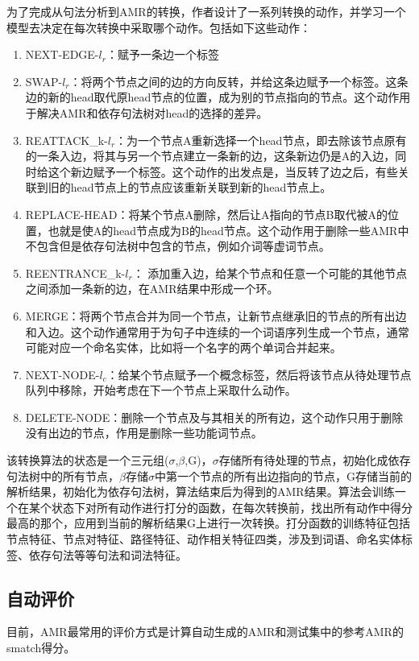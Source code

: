 \documentclass[master, winfont]{njuthesis}
\begin{document}
为了完成从句法分析到AMR的转换，作者设计了一系列转换的动作，并学习一个模型去决定在每次转换中采取哪个动作。包括如下这些动作：
\begin{enumerate}
	\item NEXT-EDGE-$l_r$：赋予一条边一个标签
	\item SWAP-$l_r$：将两个节点之间的边的方向反转，并给这条边赋予一个标签。这条边的新的head取代原head节点的位置，成为别的节点指向的节点。这个动作用于解决AMR和依存句法树对head的选择的差异。
	\item REATTACK\_k-$l_r$：为一个节点A重新选择一个head节点，即去除该节点原有的一条入边，将其与另一个节点建立一条新的边，这条新边仍是A的入边，同时给这个新边赋予一个标签。这个动作的出发点是，当反转了边之后，有些关联到旧的head节点上的节点应该重新关联到新的head节点上。
	\item REPLACE-HEAD：将某个节点A删除，然后让A指向的节点B取代被A的位置，也就是使A的head节点成为B的head节点。这个动作用于删除一些AMR中不包含但是依存句法树中包含的节点，例如介词等虚词节点。
	\item REENTRANCE\_k-$l_r$：	添加重入边，给某个节点和任意一个可能的其他节点之间添加一条新的边，在AMR结果中形成一个环。
	\item MERGE：将两个节点合并为同一个节点，让新节点继承旧的节点的所有出边和入边。这个动作通常用于为句子中连续的一个词语序列生成一个节点，通常可能对应一个命名实体，比如将一个名字的两个单词合并起来。
	\item NEXT-NODE-$l_c$：给某个节点赋予一个概念标签，然后将该节点从待处理节点队列中移除，开始考虑在下一个节点上采取什么动作。
	\item DELETE-NODE：删除一个节点及与其相关的所有边，这个动作只用于删除没有出边的节点，作用是删除一些功能词节点。
\end{enumerate}

该转换算法的状态是一个三元组($\sigma$,$\beta$,G)，$\sigma$存储所有待处理的节点，初始化成依存句法树中的所有节点，$\beta$存储$\sigma$中第一个节点的所有出边指向的节点，G存储当前的解析结果，初始化为依存句法树，算法结束后为得到的AMR结果。算法会训练一个在某个状态下对所有动作进行打分的函数，在每次转换前，找出所有动作中得分最高的那个，应用到当前的解析结果G上进行一次转换。打分函数的训练特征包括节点特征、节点对特征、路径特征、动作相关特征四类，涉及到词语、命名实体标签、依存句法等等句法和词法特征。

\subsection{自动评价}
目前，AMR最常用的评价方式是计算自动生成的AMR和测试集中的参考AMR的smatch得分\cite{Flanigan2014}\cite{Cai2013Smatch}。
\end{document}
